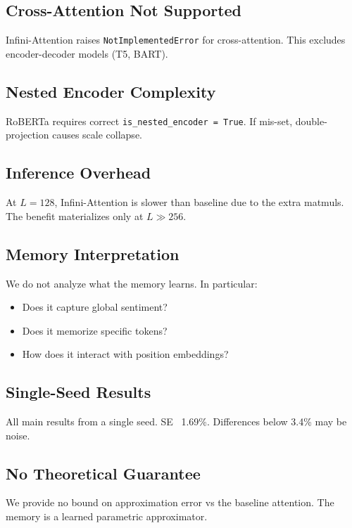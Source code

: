\subsection{Cross-Attention Not Supported}

Infini-Attention raises \texttt{NotImplementedError} for cross-attention. This 
excludes encoder-decoder models (T5, BART).

\subsection{Nested Encoder Complexity}

RoBERTa requires correct \texttt{is\_nested\_encoder = True}. If mis-set, 
double-projection causes scale collapse.

\subsection{Inference Overhead}

At $L = 128$, Infini-Attention is slower than baseline due to the extra 
matmuls. The benefit materializes only at $L \gg 256$.

\subsection{Memory Interpretation}

We do not analyze what the memory learns. In particular:

\begin{itemize}
\item Does it capture global sentiment?
\item Does it memorize specific tokens?
\item How does it interact with position embeddings?

\end{itemize}
\subsection{Single-Seed Results}

All main results from a single seed. SE ~1.69\%. Differences below 3.4\% 
may be noise.

\subsection{No Theoretical Guarantee}

We provide no bound on approximation error vs the baseline attention. 
The memory is a learned parametric approximator.

